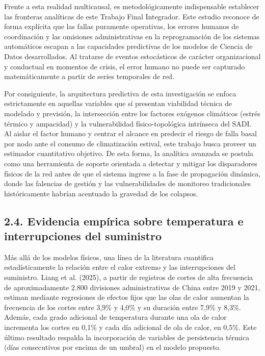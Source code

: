 Frente a esta realidad multicausal, es metodológicamente indispensable establecer las fronteras analíticas de este Trabajo Final Integrador. Este estudio reconoce de forma explícita que las fallas puramente operativas, los errores humanos de coordinación y las omisiones administrativas en la reprogramación de los sistemas automáticos escapan a las capacidades predictivas de los modelos de Ciencia de Datos desarrollados. Al tratarse de eventos estocásticos de carácter organizacional y conductual en momentos de crisis, el error humano no puede ser capturado matemáticamente a partir de series temporales de red.

Por consiguiente, la arquitectura predictiva de esta investigación se enfoca estrictamente en aquellas variables que sí presentan viabilidad técnica de modelado y previsión, la intersección entre los factores exógenos climáticos (estrés térmico y ampacidad) y la vulnerabilidad físico-topológica intrínseca del SADI. Al aislar el factor humano y centrar el alcance en predecir el riesgo de falla basal por nodo ante el consumo de climatización estival, este trabajo busca proveer un estimador cuantitativo objetivo. De esta forma, la analítica avanzada se postula como una herramienta de soporte orientada a detectar y mitigar los disparadores físicos de la red antes de que el sistema ingrese a la fase de propagación dinámica, donde las falencias de gestión y las vulnerabilidades de monitoreo tradicionales históricamente habrían acentuado la gravedad de los colapsos.

\hypertarget{evidencia-empuxedrica-sobre-temperatura-e-interrupciones-del-suministro}{%
\subsection{2.4. Evidencia empírica sobre temperatura e interrupciones del suministro}\label{evidencia-empuxedrica-sobre-temperatura-e-interrupciones-del-suministro}}

Más allá de los modelos físicos, una línea de la literatura cuantifica estadísticamente la relación entre el calor extremo y las interrupciones del suministro. Liang et al. (2025), a partir de registros de cortes de alta frecuencia de aproximadamente 2.800 divisiones administrativas de China entre 2019 y 2021, estiman mediante regresiones de efectos fijos que las olas de calor aumentan la frecuencia de los cortes entre 3,9\% y 4,0\% y su duración entre 7,9\% y 8,3\%. Además, cada grado adicional de temperatura durante una ola de calor incrementa los cortes en 0,1\% y cada día adicional de ola de calor, en 0,5\%. Este último resultado respalda la incorporación de variables de persistencia térmica (días consecutivos por encima de un umbral) en el modelo propuesto.

